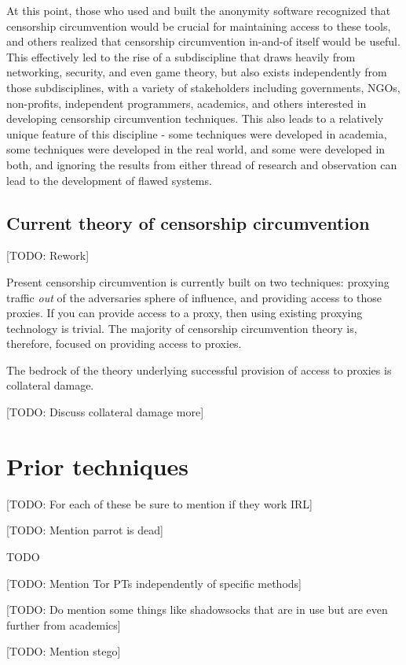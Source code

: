 \documentclass[12pt]{report}
\begin{document}
At this point, those who used and built the anonymity software recognized that censorship circumvention would be crucial for maintaining access to these tools, and others realized that censorship circumvention in-and-of itself would be useful. This effectively led to the rise of a subdiscipline that draws heavily from networking, security, and even game theory, but also exists independently from those subdisciplines, with a variety of stakeholders including governments, NGOs, non-profits, independent programmers, academics, and others interested in developing censorship circumvention techniques. This also leads to a relatively unique feature of this discipline - some techniques were developed in academia, some techniques were developed in the real world, and some were developed in both, and ignoring the results from either thread of research and observation can lead to the development of flawed systems.

\subsection{Current theory of censorship circumvention}

[TODO: Rework]

Present censorship circumvention is currently built on two techniques: proxying traffic \emph{out} of the adversaries sphere of influence, and providing access to those proxies. If you can provide access to a proxy, then using existing proxying technology is trivial. The majority of censorship circumvention theory is, therefore, focused on providing access to proxies.

The bedrock of the theory underlying successful provision of access to proxies is collateral damage.

[TODO: Discuss collateral damage more]

\section{Prior techniques}

[TODO: For each of these be sure to mention if they work IRL]

[TODO: Mention parrot is dead]

TODO

[TODO: Mention Tor PTs independently of specific methods]

[TODO: Do mention some things like shadowsocks that are in use but are even further from academics]

[TODO: Mention stego]
\end{document}
